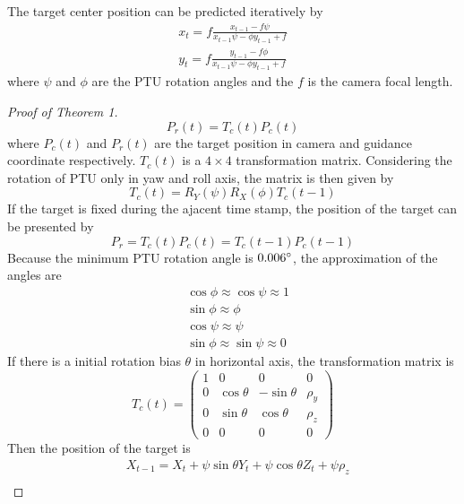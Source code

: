 \documentclass[journal,article,submit,moreauthors,pdftex,10pt,a4paper]{mdpi}
\begin{document}
\begin{Theorem}
The target center position can be predicted iteratively by
\begin{align}
\label{eq:prev_predict_curr}
x_{t} = f\frac{x_{t-1} - f\psi }{x_{t-1}  \psi  - \phi y_{t-1} + f} \\
y_{t} = f\frac{y_{t-1} -f\phi}{  x_{t-1} \psi - \phi y_{t-1} + f}
\end{align}
where $\psi$ and $\phi$ are the PTU rotation angles and the $f$ is the camera focal length.
\end{Theorem}
\begin{proof}[Proof of Theorem 1]

\begin{equation}
P_r(t) = T_c(t) P_c(t)
\end{equation}
where $P_c(t)$ and $P_r(t)$ are the target position in camera and guidance coordinate respectively. $T_c(t)$ is a $4 \times 4$ transformation matrix. 
Considering the rotation of PTU only in yaw and roll axis, the matrix is then given by
\begin{equation}
T_c(t) = R_Y(\psi)R_X(\phi)T_c(t-1)
\end{equation}
If the target is fixed during the ajacent time stamp, the position of the target can be presented by
\begin{equation}
P_r = T_c(t) P_c(t) =T_c(t-1) P_c(t-1)
\end{equation}
Because the minimum PTU rotation angle is $0.006 \degree$, the approximation of the angles are
\begin{align}
&\cos \phi \approx \cos \psi \approx 1 \\
&\sin \phi \approx \phi \\
&\cos \psi \approx \psi \\
&\sin \phi \approx \sin \psi \approx 0
\end{align}
If there is a initial rotation bias $\theta$ in horizontal axis, the transformation matrix is 
\begin{equation}
T_c(t) =\begin{pmatrix} 1 & 0 & 0 & 0 \\ 0 & \cos \theta & -\sin \theta & \rho_y \\0 & \sin \theta & \cos \theta & \rho_z \\ 0 & 0 & 0 &0 \end{pmatrix}
\end{equation}
Then the position of the target is
\begin{align}
&X_{t-1} = X_t + \psi \sin \theta Y_t + \psi \cos \theta Z_t + \psi \rho_z \\

\end{align}
\end{proof}
\end{document}
